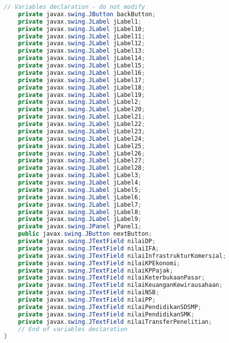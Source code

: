 \begin{lstlisting}[language=Java, caption=TampilanKondisiEksternal.java]
    // Variables declaration - do not modify                     
    private javax.swing.JButton backButton;
    private javax.swing.JLabel jLabel1;
    private javax.swing.JLabel jLabel10;
    private javax.swing.JLabel jLabel11;
    private javax.swing.JLabel jLabel12;
    private javax.swing.JLabel jLabel13;
    private javax.swing.JLabel jLabel14;
    private javax.swing.JLabel jLabel15;
    private javax.swing.JLabel jLabel16;
    private javax.swing.JLabel jLabel17;
    private javax.swing.JLabel jLabel18;
    private javax.swing.JLabel jLabel19;
    private javax.swing.JLabel jLabel2;
    private javax.swing.JLabel jLabel20;
    private javax.swing.JLabel jLabel21;
    private javax.swing.JLabel jLabel22;
    private javax.swing.JLabel jLabel23;
    private javax.swing.JLabel jLabel24;
    private javax.swing.JLabel jLabel25;
    private javax.swing.JLabel jLabel26;
    private javax.swing.JLabel jLabel27;
    private javax.swing.JLabel jLabel28;
    private javax.swing.JLabel jLabel3;
    private javax.swing.JLabel jLabel4;
    private javax.swing.JLabel jLabel5;
    private javax.swing.JLabel jLabel6;
    private javax.swing.JLabel jLabel7;
    private javax.swing.JLabel jLabel8;
    private javax.swing.JLabel jLabel9;
    private javax.swing.JPanel jPanel1;
    public javax.swing.JButton nextButton;
    private javax.swing.JTextField nilaiDP;
    private javax.swing.JTextField nilaiIFA;
    private javax.swing.JTextField nilaiInfrastrukturKomersial;
    private javax.swing.JTextField nilaiKPEkonomi;
    private javax.swing.JTextField nilaiKPPajak;
    private javax.swing.JTextField nilaiKeterbukaanPasar;
    private javax.swing.JTextField nilaiKeuanganKewirausahaan;
    private javax.swing.JTextField nilaiNSB;
    private javax.swing.JTextField nilaiPP;
    private javax.swing.JTextField nilaiPendidikanSDSMP;
    private javax.swing.JTextField nilaiPendidikanSMK;
    private javax.swing.JTextField nilaiTransferPenelitian;
    // End of variables declaration                   
}

\end{lstlisting}

